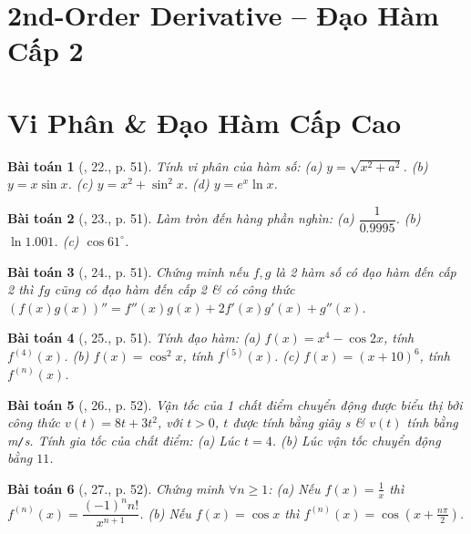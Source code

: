 \documentclass{article}
\newtheorem{baitoan}{Bài toán}
\begin{document}

\section{2nd-Order Derivative -- Đạo Hàm Cấp 2}


\section{Vi Phân \& Đạo Hàm Cấp Cao}

\begin{baitoan}[\cite{TLCT_BT_dai_so_giai_tich_11}, 22., p. 51]
	Tính vi phân của hàm số: (a) $y = \sqrt{x^2 + a^2}$. (b) $y = x\sin x$. (c) $y = x^2 + \sin^2x$. (d) $y = e^x\ln x$.
\end{baitoan}

\begin{baitoan}[\cite{TLCT_BT_dai_so_giai_tich_11}, 23., p. 51]
	Làm tròn đến hàng phần nghìn: (a) $\dfrac{1}{0.9995}$. (b) $\ln1.001$. (c) $\cos61^\circ$.
\end{baitoan}

\begin{baitoan}[\cite{TLCT_BT_dai_so_giai_tich_11}, 24., p. 51]
	Chứng minh nếu $f,g$ là 2 hàm số có đạo hàm đến cấp 2 thì $fg$ cũng có đạo hàm đến cấp 2 \& có công thức $(f(x)g(x))'' = f''(x)g(x) + 2f'(x)g'(x) + g''(x)$.
\end{baitoan}

\begin{baitoan}[\cite{TLCT_BT_dai_so_giai_tich_11}, 25., p. 51]
	Tính đạo hàm: (a) $f(x) = x^4 - \cos2x$, tính $f^{(4)}(x)$. (b) $f(x) = \cos^2x$, tính $f^{(5)}(x)$. (c) $f(x) = (x + 10)^6$, tính $f^{(n)}(x)$.
\end{baitoan}

\begin{baitoan}[\cite{TLCT_BT_dai_so_giai_tich_11}, 26., p. 52]
	Vận tốc của 1 chất điểm chuyển động được biểu thị bởi công thức $v(t) = 8t + 3t^2$, với $t > 0$, $t$ được tính bằng giây {\rm s} \& $v(t)$ tính bằng {\rm m{\tt/}s}. Tính gia tốc của chất điểm: (a) Lúc $t = 4$. (b) Lúc vận tốc chuyển động bằng $11$.
\end{baitoan}

\begin{baitoan}[\cite{TLCT_BT_dai_so_giai_tich_11}, 27., p. 52]
	Chứng minh $\forall n\ge1$: (a) Nếu $f(x) = \frac{1}{x}$ thì $f^{(n)}(x) = \dfrac{(-1)^nn!}{x^{n+1}}$. (b) Nếu $f(x) = \cos x$ thì $f^{(n)}(x) = \cos\left(x + \frac{n\pi}{2}\right)$.
\end{baitoan}
\end{document}
